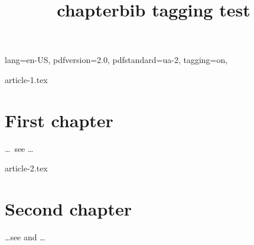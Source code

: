 \DocumentMetadata
  {
    lang=en-US,
    pdfversion=2.0,
    pdfstandard=ua-2,
    tagging=on,
  }
\begin{filecontents}[force]{article-1.tex}
\chapter{First chapter}
\ldots\ see \cite{inbook-full} \ldots


\end{filecontents}
\begin{filecontents}[force]{article-2.tex}
\chapter{Second chapter}
\ldots see \cite{inbook-full}
and \cite{article-full} \ldots


\end{filecontents}
\documentclass{report}

\usepackage[
  gather %
  ]{chapterbib} 

\title{chapterbib tagging test}





